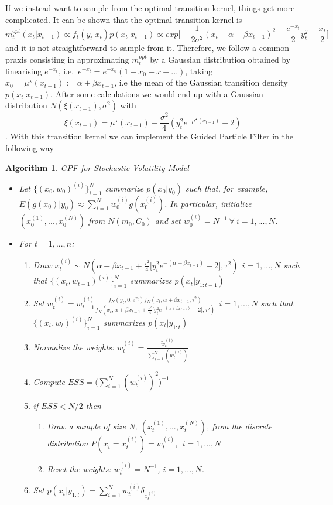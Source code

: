 \documentclass[
]{book}
\theoremstyle{break}
\theoremstyle{nonumberplain}
\newtheorem{algorithm}{Algorithm}[section]
\begin{document}
If we instead want to sample from the optimal transition kernel, things
get more complicated. It can be shown that the optimal transition kernel
is
\[ m_{t}^{opt}(x_{t}|x_{t-1}) \propto f_{t}(y_{t}|x_{t})p(x_{t}|x_{t-1}) \propto exp\bigg[-\frac{1}{2\sigma^{2}}(x_{t}-\alpha-\beta x_{t-1})^{2}-\frac{e^{-x_{t}}}{2}y_{t}^{2}-\frac{x_{t}}{2}\bigg]\]
and it is not straightforward to sample from it. Therefore, we follow a
common praxis consisting in approximating \(m_{t}^{opt}\) by a Gaussian
distribution obtained by linearising \(e^{-x_{t}}\),
i.e.~\(e^{-x_{t}}=e^{-x_{0}}(1+x_{0}-x+...)\), taking
\(x_{0}=\mu^{\star}(x_{t-1}) := \alpha + \beta x_{t-1}\), i.e the mean
of the Gaussian transition density \(p(x_{t}|x_{t-1})\). After some
calculations we would end up with a Gaussian distribution
\(N(\xi(x_{t-1}),\sigma^{2})\) with
\[ \xi(x_{t-1}) = \mu^{\star}(x_{t-1}) + \frac{\sigma^{2}}{4}(y_{t}^{2}e^{-\mu^{\star}(x_{t-1})}-2)\].
With this transition kernel we can implement the Guided Particle Filter
in the following way

\begin{algorithm} GPF for Stochastic Volatility Model
\begin{itemize}
\item Let $\{(x_{0},w_{0})^{(i)}\}_{i=1}^{N}$ summarize $p(x_{0}|y_{0})$ such that, for example, $E(g(x_{0})|y_{0}) \approx \sum_{i=1}^{N}w_{0}^{(i)}g(x_{0}^{(i)})$. In particular, initialize $(x_{0}^{(1)},...,x_{0}^{(N)})$ from $N(m_{0},C_{0})$ and set $w_{0}^{(i)}=N^{-1} \ \forall \ i=1,...,N$.
\item For $t=1,...,n$:
\begin{enumerate}
\item Draw $x_{t}^{(i)} \sim N(\alpha+\beta x_{t-1}+\frac{\tau^2}{4}\big[y_{t}^2e^{-(\alpha+\beta x_{t-1})}-2\big],\tau^{2}) \ \ i=1,...,N$ such that $\{(x_{t},w_{t-1})^{(i)}\}_{i=1}^{N}$ summarizes $p(x_{t}|y_{1:t-1})$
\item Set $w_{t}^{(i)} = w_{t-1}^{(i)}\frac{f_{N}(y_{t};0,e^{x_{t}})f_{N}(x_{t};\alpha+\beta x_{t-1},\tau^{2})}{f_{N}(x_{t};\alpha+\beta x_{t-1}+\frac{\tau^2}{4}\big[y_{t}^2e^{-(\alpha+\beta x_{t-1})}-2\big],\tau^{2})} \ \ i=1,...,N$ such that $\{(x_{t},w_{t})^{(i)}\}_{i=1}^{N}$ summarizes $p(x_{t}|y_{1:t})$
\item Normalize the weights: $w_{t}^{(i)}=\frac{\tilde{w}_{t}^{(i)}}{\sum_{j=1}^{N}(\tilde{w}_{t}^{(j)})}$
\item Compute $ESS=\Bigg(\sum_{i=1}^{N}(w_{t}^{(i)})^{2}\Bigg)^{-1}$
\item if $ESS<N/2$ then
\begin{enumerate}
\item Draw a sample of size N, $(x_{t}^{(1)},...,x_{t}^{(N)})$, from the discrete distribution $P(x_{t}=x_{t}^{(i)})=w_{t}^{(i)},\ \ i=1,...,N$
\item Reset the weights: $w_{t}^{(i)}=N^{-1}$, $i=1,...,N$.
\end{enumerate}
\item Set $p(x_{t}|y_{1:t})=\sum_{i=1}^{N}w_{t}^{(i)}\delta_{x_{t}^{(i)}}$
\end{enumerate}
\end{itemize}
\end{algorithm}
\end{document}
